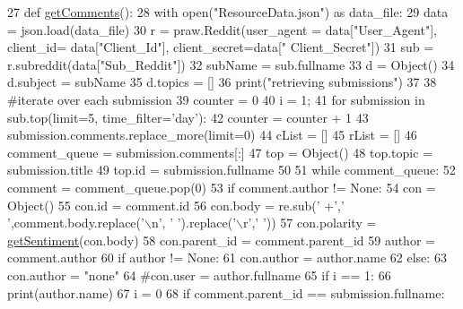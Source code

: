 \begin{DoxyCode}
27 \textcolor{keyword}{def }\hyperlink{namespacecomments_aadd79f53e655498635ea6597a88b219c}{getComments}():
28     with open(\textcolor{stringliteral}{"ResourceData.json"}) \textcolor{keyword}{as} data\_file:
29         data = json.load(data\_file)
30     r = praw.Reddit(user\_agent = data[\textcolor{stringliteral}{"User\_Agent"}], client\_id= data[\textcolor{stringliteral}{"Client\_Id"}], client\_secret=data[\textcolor{stringliteral}{"
      Client\_Secret"}])
31     sub = r.subreddit(data[\textcolor{stringliteral}{"Sub\_Reddit"}])
32     subName = sub.fullname
33     d = Object()
34     d.subject = subName
35     d.topics = []
36     print(\textcolor{stringliteral}{"retrieving submissions"})
37     
38     \textcolor{comment}{#iterate over each submission}
39     counter = 0
40     i = 1;
41     \textcolor{keywordflow}{for} submission \textcolor{keywordflow}{in} sub.top(limit=5, time\_filter=\textcolor{stringliteral}{'day'}):
42         counter = counter + 1
43         submission.comments.replace\_more(limit=0)   
44         cList = []
45         rList = []  
46         comment\_queue = submission.comments[:]
47         top = Object()
48         top.topic = submission.title
49         top.id = submission.fullname
50 
51         \textcolor{keywordflow}{while} comment\_queue:
52             comment = comment\_queue.pop(0)
53             \textcolor{keywordflow}{if} comment.author != \textcolor{keywordtype}{None}:
54                 con = Object()
55                 con.id = comment.id
56                 con.body = re.sub(\textcolor{stringliteral}{' +'},\textcolor{stringliteral}{' '},comment.body.replace(\textcolor{stringliteral}{'\(\backslash\)n'}, \textcolor{stringliteral}{' '}).replace(\textcolor{stringliteral}{'\(\backslash\)r'},\textcolor{stringliteral}{' '}))
57                 con.polarity = \hyperlink{namespacecomments_a15146b34dd7b539d081e27278c3c322e}{getSentiment}(con.body)
58                 con.parent\_id = comment.parent\_id
59                 author = comment.author
60                 \textcolor{keywordflow}{if} author != \textcolor{keywordtype}{None}:
61                     con.author = author.name
62                 \textcolor{keywordflow}{else}:
63                     con.author = \textcolor{stringliteral}{"none"}
64                 \textcolor{comment}{#con.user = author.fullname}
65                 \textcolor{keywordflow}{if} i == 1:
66                     print(author.name)
67                     i = 0
68                 \textcolor{keywordflow}{if} comment.parent\_id == submission.fullname:

\end{DoxyCode}
